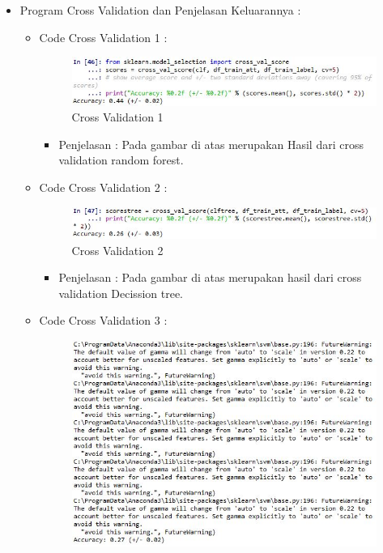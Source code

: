 \begin{enumerate}
\begin{itemize}
\begin{itemize}
\par
\par
\item Program Cross Validation dan Penjelasan Keluarannya :
\begin{itemize}
\item Code Cross Validation 1 :
\par
\begin{figure}[ht]
\centering
\includegraphics[scale=0.7]{figures/cod26.jpg}
\caption{Cross Validation 1}
\label{contoh}
\end{figure}
\par
\begin{itemize}
\item Penjelasan : Pada gambar di atas merupakan Hasil dari cross validation random forest.
\par 
\par
\end{itemize}
\item Code Cross Validation 2  :
\par
\begin{figure}[ht]
\centering
\includegraphics[scale=0.7]{figures/cod27.jpg}
\caption{Cross Validation 2}
\label{contoh}
\end{figure}
\par
\begin{itemize}
\item Penjelasan : Pada gambar di atas merupakan hasil dari cross validation Decission tree.
\par
\par
\end{itemize}
\item Code Cross Validation 3 :
\par
\begin{figure}[ht]
\centering
\includegraphics[scale=0.7]{figures/cod28.jpg}

\end{figure}
\end{itemize}
\end{itemize}
\end{itemize}
\end{enumerate}
